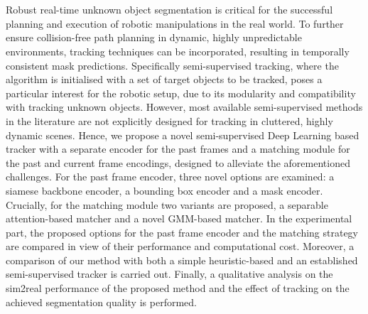 \chapter{\abstractname}


Robust real-time unknown object segmentation is critical for the successful planning and execution of robotic manipulations in the real world. 
To further ensure collision-free path planning in dynamic, highly unpredictable environments, tracking techniques can be incorporated, resulting in temporally consistent mask predictions.
Specifically semi-supervised tracking, where the algorithm is initialised with a set of target objects to be tracked, poses a particular interest for the robotic setup, due to its modularity and compatibility with tracking unknown objects. However, most available semi-supervised methods in the literature are not explicitly designed for tracking in cluttered, highly dynamic scenes.  
Hence, we propose a novel semi-supervised Deep Learning based tracker with a separate encoder for the past frames and a matching module for the past and current frame encodings, designed to alleviate the aforementioned challenges. For the past frame encoder, three novel options are examined: a siamese backbone encoder, a bounding box encoder and a mask encoder. Crucially, for the matching module two variants are proposed, a separable attention-based matcher and a novel GMM-based matcher. In the experimental part, the proposed options for the past frame encoder and the matching strategy are compared in view of their performance and computational cost. 
Moreover, a comparison of our method with both a simple heuristic-based and an established semi-supervised tracker is carried out. Finally, a qualitative analysis on the sim2real performance of the proposed method and the effect of tracking on the achieved segmentation quality is performed. 
   
\makeatletter
{}
{\renewcommand{\abstractname}{Kurzfassung}}
{\renewcommand{\abstractname}{Abstract}}
\makeatother

\chapter{\abstractname}


